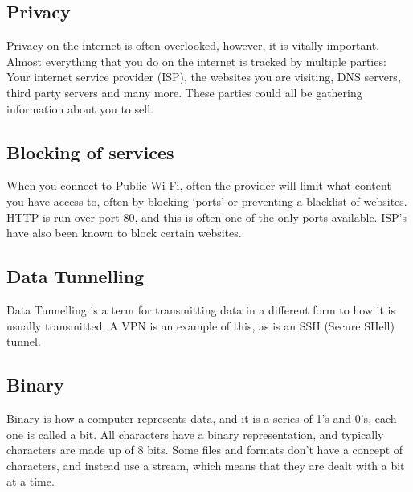 \subsection{Privacy}
Privacy on the internet is often overlooked, however, it is vitally important\cite{privacyrulez}. Almost everything that you do on the internet is tracked by multiple parties: Your internet service provider (ISP), the websites you are visiting, DNS servers, third party servers and many more. These parties could all be gathering information about you to sell.

\subsection{Blocking of services}
When you connect to Public Wi-Fi, often the provider will limit what content you have access to, often by blocking `ports' or preventing a blacklist of websites.\\
HTTP is run over port 80, and this is often one of the only ports available. ISP's have also been known to block certain websites.

\subsection{Data Tunnelling}
Data Tunnelling is a term for transmitting data in a different form to how it is usually transmitted. A VPN is an example of this, as is an SSH (Secure SHell) tunnel.

\subsection{Binary}
Binary is how a computer represents data, and it is a series of 1's and 0's, each one is called a bit.
All characters have a binary representation, and typically characters are made up of 8 bits. Some files and formats don't have a concept of characters, and instead use a stream, which means that they are dealt with a bit at a time.

